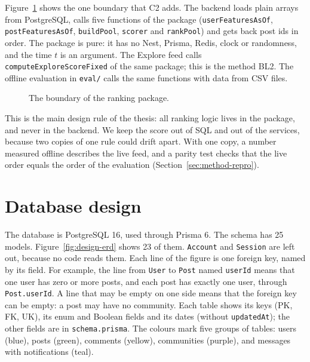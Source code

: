 Figure~\ref{fig:design-boundary} shows the one boundary that C2 adds. The backend loads plain arrays from PostgreSQL, calls five functions of the package (\texttt{user\allowbreak Features\allowbreak AsOf}, \texttt{post\allowbreak Features\allowbreak AsOf}, \texttt{buildPool}, \texttt{scorer} and \texttt{rankPool}) and gets back post ids in order. The package is pure: it has no Nest, Prisma, Redis, clock or randomness, and the time $t$ is an argument. The Explore feed calls \texttt{computeExploreScoreFixed} of the same package; this is the method BL2. The offline evaluation in \texttt{eval/} calls the same functions with data from CSV files.

\begin{figure}[htbp]
  \centering
  \caption{The boundary of the ranking package.}
  \label{fig:design-boundary}
\end{figure}

This is the main design rule of the thesis: all ranking logic lives in the package, and never in the backend. We keep the score out of SQL and out of the services, because two copies of one rule could drift apart. With one copy, a number measured offline describes the live feed, and a parity test checks that the live order equals the order of the evaluation (Section~\ref{sec:method-repro}).

\section{Database design}
\label{sec:design-database}

The database is PostgreSQL 16, used through Prisma 6. The schema has 25 models. Figure~\ref{fig:design-erd} shows 23 of them. \texttt{Account} and \texttt{Session} are left out, because no code reads them. Each line of the figure is one foreign key, named by its field. For example, the line from \texttt{User} to \texttt{Post} named \texttt{userId} means that one user has zero or more posts, and each post has exactly one user, through \texttt{Post.userId}. A line that may be empty on one side means that the foreign key can be empty: a post may have no community. Each table shows its keys (PK, FK, UK), its enum and Boolean fields and its dates (without \texttt{updatedAt}); the other fields are in \texttt{schema.prisma}. The colours mark five groups of tables: users (blue), posts (green), comments (yellow), communities (purple), and messages with notifications (teal).

